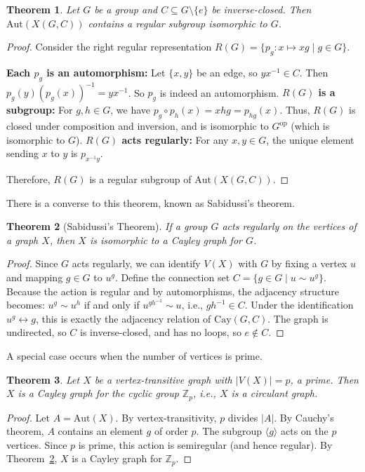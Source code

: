 \documentclass[12pt,a4paper,openany]{book}
\newtheorem{theorem}{Theorem}[section]
\begin{document}
\begin{theorem}\label{thm:cayley-contains-regular-subgroup}
Let $G$ be a group and $C \subseteq G \setminus \{e\}$ be inverse-closed. Then $\mathrm{Aut}(X(G,C))$ contains a regular subgroup isomorphic to $G$.
\end{theorem}
\begin{proof}
Consider the right regular representation $R(G) = \{p_g : x \mapsto xg \mid g \in G\}$.

    \textbf{Each $p_g$ is an automorphism:} Let $\{x, y\}$ be an edge, so $yx^{-1} \in C$. Then $p_g(y)(p_g(x))^{-1} = yx^{-1}$.  So $p_g$ is indeed an automorphism.
     \textbf{$R(G)$ is a subgroup:} For $g, h \in G$, we have $p_g \circ p_h(x) = xhg = p_{hg}(x)$. Thus, $R(G)$ is closed under composition and inversion, and is isomorphic to $G^{\text{op}}$ (which is isomorphic to $G$).
    \textbf{$R(G)$ acts regularly:} For any $x, y \in G$, the unique element sending $x$ to $y$ is $p_{x^{-1}y}$.

Therefore, $R(G)$ is a regular subgroup of $\mathrm{Aut}(X(G,C))$.
\end{proof}

There is a converse to this theorem, known as Sabidussi's theorem.

\begin{theorem}[Sabidussi's Theorem]\label{thm:sabidussi}
If a group $G$ acts regularly on the vertices of a graph $X$, then $X$ is isomorphic to a Cayley graph for $G$.
\end{theorem}
\begin{proof}
Since $G$ acts regularly, we can identify $V(X)$ with $G$ by fixing a vertex $u$ and mapping $g \in G$ to $u^g$. Define the connection set $C = \{ g \in G \mid u \sim u^g \}$. Because the action is regular and by automorphisms, the adjacency structure becomes: $u^g \sim u^h$ if and only if $u^{gh^{-1}} \sim u$, i.e., $gh^{-1} \in C$. Under the identification $u^g \leftrightarrow g$, this is exactly the adjacency relation of $\mathrm{Cay}(G, C)$. The graph is undirected, so $C$ is inverse-closed, and has no loops, so $e \notin C$.
\end{proof}

A special case occurs when the number of vertices is prime.

\begin{theorem}\label{thm:prime-order-circulant}
Let $X$ be a vertex-transitive graph with $|V(X)| = p$, a prime. Then $X$ is a Cayley graph for the cyclic group $\mathbb{Z}_p$, i.e., $X$ is a circulant graph.
\end{theorem}
\begin{proof}
Let $A = \mathrm{Aut}(X)$. By vertex-transitivity, $p$ divides $|A|$. By Cauchy's theorem, $A$ contains an element $g$ of order $p$. The subgroup $\langle g \rangle$ acts on the $p$ vertices. Since $p$ is prime, this action is semiregular (and hence regular). By Theorem~\ref{thm:sabidussi}, $X$ is a Cayley graph for $\mathbb{Z}_p$.
\end{proof}
\end{document}
